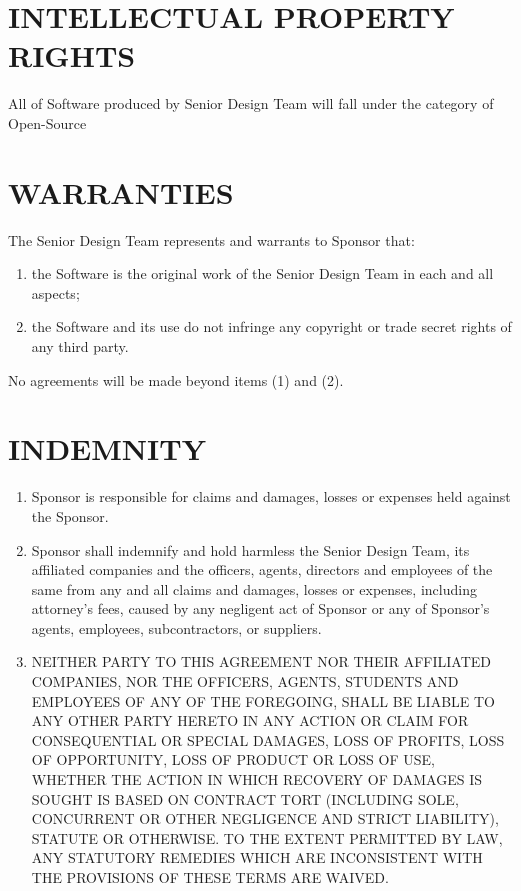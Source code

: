 \documentclass[11pt]{article}
\begin{document}
\section{INTELLECTUAL PROPERTY RIGHTS } 

All of Software produced by Senior Design Team will fall under the category of Open-Source

\section{WARRANTIES }  

The Senior Design Team represents and warrants to Sponsor that:         
\begin{enumerate}  \itemsep4pt \parskip0pt 
\item  the Software is the original work of the Senior Design Team in each and all aspects;        

\item the Software and its use do not infringe any copyright or   trade secret rights of any third party.  
\end{enumerate}
No agreements will be made beyond items (1) and (2).

\section{INDEMNITY}   
\begin{enumerate}  \itemsep4pt \parskip0pt 
\item Sponsor is responsible for claims and damages, losses or expenses held against the Sponsor.

\item  Sponsor shall       indemnify and hold harmless the Senior Design Team, its affiliated companies       and the officers, agents, directors and employees of the same from       any and all claims and damages, losses or expenses, including       attorney's fees, caused by any negligent act of Sponsor or any of       Sponsor's agents, employees, subcontractors, or suppliers.    

\item  NEITHER PARTY TO THIS AGREEMENT NOR THEIR AFFILIATED COMPANIES,       NOR THE OFFICERS, AGENTS, STUDENTS AND EMPLOYEES OF ANY OF THE       FOREGOING, SHALL BE LIABLE TO ANY OTHER PARTY HERETO IN ANY ACTION       OR CLAIM FOR CONSEQUENTIAL OR SPECIAL DAMAGES, LOSS OF PROFITS,       LOSS OF OPPORTUNITY, LOSS OF PRODUCT OR LOSS OF USE, WHETHER THE       ACTION IN WHICH RECOVERY OF DAMAGES IS SOUGHT IS BASED ON CONTRACT       TORT (INCLUDING SOLE, CONCURRENT OR OTHER NEGLIGENCE AND STRICT       LIABILITY), STATUTE OR OTHERWISE. TO THE EXTENT PERMITTED BY LAW,       ANY STATUTORY REMEDIES WHICH ARE INCONSISTENT WITH THE PROVISIONS       OF THESE TERMS ARE WAIVED.  
\end{enumerate}
\end{document}
